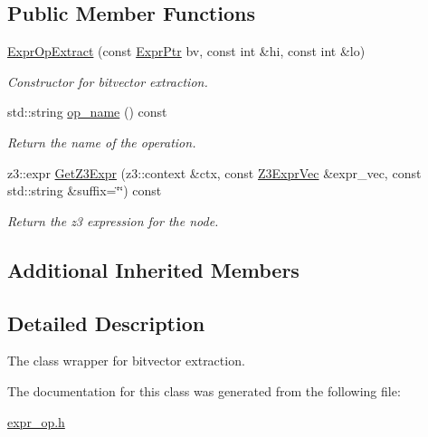 \subsection*{Public Member Functions}
\begin{DoxyCompactItemize}
\item 
\mbox{\label{classilang_1_1_expr_op_extract_accf2560e8ec2044f523816c08d609a81}} 
\mbox{\hyperlink{classilang_1_1_expr_op_extract_accf2560e8ec2044f523816c08d609a81}{Expr\+Op\+Extract}} (const \mbox{\hyperlink{classilang_1_1_expr_a85952b6a34620c4c8cab6bac9c9fdf8c}{Expr\+Ptr}} bv, const int \&hi, const int \&lo)
\begin{DoxyCompactList}\small\item\em Constructor for bitvector extraction. \end{DoxyCompactList}\item 
\mbox{\label{classilang_1_1_expr_op_extract_a63315a8b3190be6adc0986241647a0ce}} 
std\+::string \mbox{\hyperlink{classilang_1_1_expr_op_extract_a63315a8b3190be6adc0986241647a0ce}{op\+\_\+name}} () const
\begin{DoxyCompactList}\small\item\em Return the name of the operation. \end{DoxyCompactList}\item 
\mbox{\label{classilang_1_1_expr_op_extract_a3bf28dc9f01c738a076f2f76dbaa72e8}} 
z3\+::expr \mbox{\hyperlink{classilang_1_1_expr_op_extract_a3bf28dc9f01c738a076f2f76dbaa72e8}{Get\+Z3\+Expr}} (z3\+::context \&ctx, const \mbox{\hyperlink{namespaceilang_adc4eee919aa24fff882d03a48d733c19}{Z3\+Expr\+Vec}} \&expr\+\_\+vec, const std\+::string \&suffix=\char`\"{}\char`\"{}) const
\begin{DoxyCompactList}\small\item\em Return the z3 expression for the node. \end{DoxyCompactList}\end{DoxyCompactItemize}
\subsection*{Additional Inherited Members}


\subsection{Detailed Description}
The class wrapper for bitvector extraction. 

The documentation for this class was generated from the following file\+:\begin{DoxyCompactItemize}
\item 
\mbox{\hyperlink{expr__op_8h}{expr\+\_\+op.\+h}}\end{DoxyCompactItemize}
